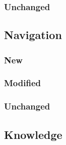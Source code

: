 \documentclass[main.tex]{subfiles}
\begin{document}
                \subsubsection{Unchanged}
                \subsection{Navigation}
                \subsubsection{New}
                \subsubsection{Modified}
                \subsubsection{Unchanged}
                \subsection{Knowledge}
\end{document}
